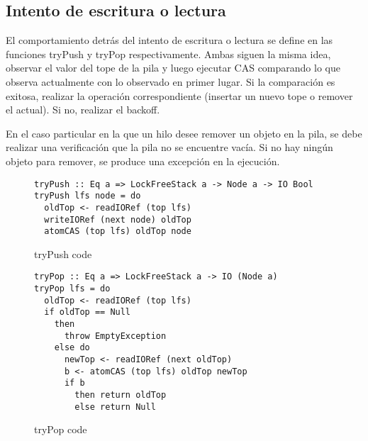\clearpage
\subsection{Intento de escritura o lectura}
El comportamiento detrás del intento de escritura o lectura se define en las funciones tryPush y tryPop respectivamente. Ambas siguen la misma idea, observar el valor del tope de la pila y luego ejecutar CAS comparando lo que observa actualmente con lo observado en primer lugar. Si la comparación es exitosa, realizar la operación correspondiente (insertar un nuevo tope o remover el actual). Si no, realizar el backoff.

En el caso particular en la que un hilo desee remover un objeto en la pila, se debe realizar una verificación que la pila no se encuentre vacía. Si no hay ningún objeto para remover, se produce una excepción en la ejecución.

\begin{figure}[H]
\begin{verbatim}
tryPush :: Eq a => LockFreeStack a -> Node a -> IO Bool
tryPush lfs node = do
  oldTop <- readIORef (top lfs)
  writeIORef (next node) oldTop
  atomCAS (top lfs) oldTop node
\end{verbatim}
\caption{tryPush code}
\end{figure}

\begin{figure}[H]
\begin{verbatim}
tryPop :: Eq a => LockFreeStack a -> IO (Node a)
tryPop lfs = do
  oldTop <- readIORef (top lfs)
  if oldTop == Null
    then
      throw EmptyException
    else do
      newTop <- readIORef (next oldTop)
      b <- atomCAS (top lfs) oldTop newTop
      if b
        then return oldTop
        else return Null
\end{verbatim}
\caption{tryPop code}
\end{figure}

\clearpage
